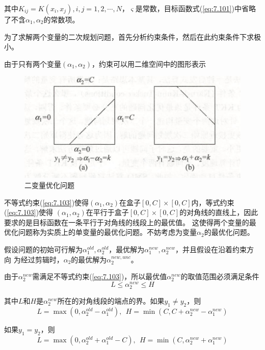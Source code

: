其中$K_{ij}=K(x_i,x_j),i,j=1,2,\cdots,N$，$\varsigma$是常数，目标函数式(\ref{eq:7.101})中省略了不含$\alpha_1,\alpha_2$的常数项。

为了求解两个变量的二次规划问题，首先分析约束条件，然后在此约束条件下求极小。

由于只有两个变量$(\alpha_1,\alpha_2)$，约束可以用二维空间中的图形表示

\begin{figure}[H]
    \centering
    \includegraphics[scale=0.5]{figures/二变量优化问题.png}
    \caption{二变量优化问题}
    \label{二变量优化问题}
\end{figure}

不等式约束(\ref{eq:7.103})使得$(\alpha_1,\alpha_2)$在盒子$[0,C]\times [0,C]$内，等式约束(\ref{eq:7.103})使得
$(\alpha_1,\alpha_2)$在平行于盒子$[0,C]\times [0,C]$的对角线的直线上，因此要求的是目标函数在一条平行于对角线的线段上的最优值。
这使得两个变量的最优化问题称为实质上的单变量的最优化问题。不妨考虑为变量$\alpha_2$的最优化问题。

假设问题的初始可行解为$\alpha^{old}_1,\alpha^{old}_2$，最优解为$\alpha^{new}_1,\alpha^{new}_2$，并且假设在沿着约束方向
为经过剪辑时，$\alpha_2$的最优解为$\alpha^{new,unc}_2$。

由于$\alpha^{new}_2$需满足不等式约束(\ref{eq:7.103})，所以最优值$\alpha^{new}_2$的取值范围必须满足条件
\begin{equation}
    L\leqslant \alpha^{new}_2\leqslant H
\end{equation}

其中$L$和$H$是$\alpha^{new}_2$所在的对角线段的端点的界。如果$y_1\neq y_2$，则
\begin{equation}
    L=\max(0,\alpha^{old}_2-\alpha^{old}_1),\ \ H=\min(C,C+\alpha^{new}_2-\alpha^{new}_1)
\end{equation}

如果$y_1=y_2$，则
\begin{equation}
    L=\max(0,\alpha^{old}_2+\alpha^{old}_1-C),\ \ 
    H=\min(C,\alpha^{new}_2+\alpha^{new}_1)
\end{equation}

